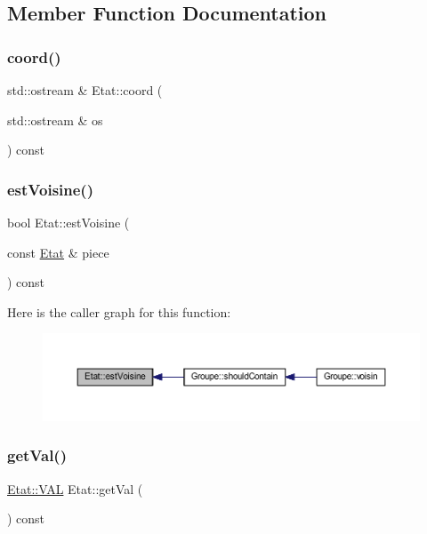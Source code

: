 \subsection{Member Function Documentation}
\mbox{\label{class_etat_a9aa2a1b7274bc6d8a66fbec9655e47d0}} 
\subsubsection{\texorpdfstring{coord()}{coord()}}
{\footnotesize\ttfamily std\+::ostream \& Etat\+::coord (\begin{DoxyParamCaption}\item[{std\+::ostream \&}]{os }\end{DoxyParamCaption}) const}

\mbox{\label{class_etat_ab6e6b44dd68c041150332cee66dc74a3}} 
\subsubsection{\texorpdfstring{est\+Voisine()}{estVoisine()}}
{\footnotesize\ttfamily bool Etat\+::est\+Voisine (\begin{DoxyParamCaption}\item[{const \hyperlink{class_etat}{Etat} \&}]{piece }\end{DoxyParamCaption}) const}

Here is the caller graph for this function\+:\nopagebreak
\begin{figure}[H]
\begin{center}
\leavevmode
\includegraphics[width=350pt]{class_etat_ab6e6b44dd68c041150332cee66dc74a3_icgraph}
\end{center}
\end{figure}
\mbox{\label{class_etat_ac0b81bbcf64cb3cc574e5a9dcdf94382}} 
\subsubsection{\texorpdfstring{get\+Val()}{getVal()}}
{\footnotesize\ttfamily \hyperlink{class_etat_af3ddb2296ffc379b7f3ad2bf832f294e}{Etat\+::\+V\+AL} Etat\+::get\+Val (\begin{DoxyParamCaption}{ }\end{DoxyParamCaption}) const}

